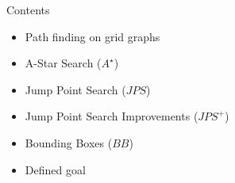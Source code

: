 \documentclass{presentation}
\begin{document}
\begin{frame}
    \titlepage
\end{frame}



\begin{frame}{Contents}
    \begin{itemize}
        \item Path finding on grid graphs
        \item A-Star Search ($A^\star$)
        \item Jump Point Search ($JPS$)
        \item Jump Point Search Improvements ($JPS^+$)
        \item Bounding Boxes ($BB$)
        \item Defined goal
    \end{itemize}
\end{frame}



\begin{frame}
\end{frame}
\end{document}
